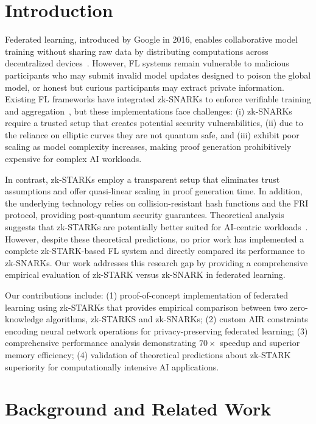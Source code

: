 \documentclass[runningheads]{llncs}
\begin{document}
\section{Introduction}

Federated learning, introduced by Google in 2016, enables collaborative model training without sharing raw data by distributing computations across decentralized devices~\cite{googlefederated2016}. 
However, FL systems remain vulnerable to malicious participants who may submit invalid model updates designed to poison the global model, or honest but curious participants may extract private information.
Existing FL frameworks have integrated zk-SNARKs to enforce verifiable training and aggregation~\cite{mainflzkp,msthesis}, but these implementations face challenges: (i) zk-SNARKs require a trusted setup that creates potential security vulnerabilities, (ii) due to the reliance on elliptic curves they are not quantum safe, and (iii) exhibit poor scaling as model complexity increases, making proof generation prohibitively expensive for complex AI workloads.

In contrast, zk-STARKs employ a transparent setup that eliminates trust assumptions and offer quasi-linear scaling in proof generation time. In addition, the underlying technology relies on collision-resistant hash functions and the FRI protocol, providing post-quantum security guarantees.
Theoretical analysis suggests that zk-STARKs are potentially better suited for AI-centric workloads~\cite{oude2024systematic}. 
However, despite these theoretical predictions, no prior work has implemented a complete zk-STARK-based FL system and directly compared its performance to zk-SNARKs. 
Our work addresses this research gap by providing a comprehensive empirical evaluation of zk-STARK versus zk-SNARK in federated learning.

Our contributions include: (1) proof-of-concept implementation of federated learning using zk-STARKs that provides empirical comparison between two zero-knowledge algorithms, zk-STARKS and zk-SNARKs; (2) custom AIR constraints encoding neural network operations for privacy-preserving federated learning; (3) comprehensive performance analysis demonstrating $70 \times$ speedup and superior memory efficiency; (4) validation of theoretical predictions about zk-STARK superiority for computationally intensive AI applications.



\section{Background and Related Work}
\end{document}
